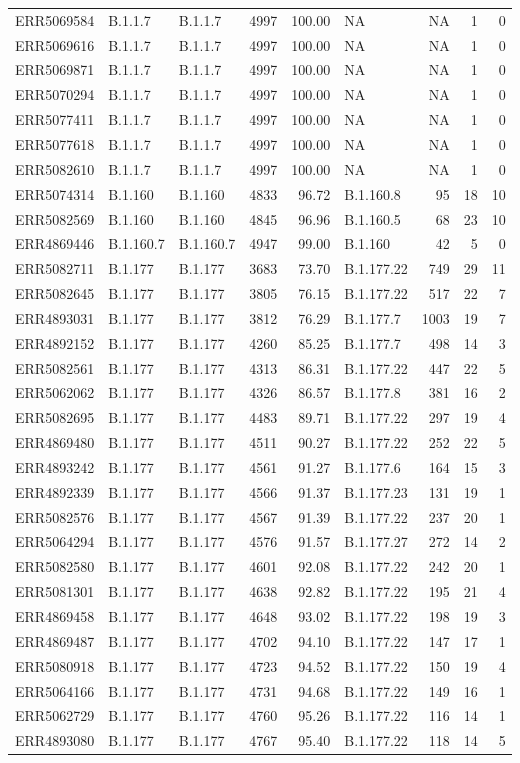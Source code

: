 \documentclass[
]{article}
\begin{document}
\begin{longtable}[]{@{}lllrrlrrr@{}}
ERR5069584 & B.1.1.7 & B.1.1.7 & 4997 & 100.00 & NA & NA & 1 &
0\tabularnewline
ERR5069616 & B.1.1.7 & B.1.1.7 & 4997 & 100.00 & NA & NA & 1 &
0\tabularnewline
ERR5069871 & B.1.1.7 & B.1.1.7 & 4997 & 100.00 & NA & NA & 1 &
0\tabularnewline
ERR5070294 & B.1.1.7 & B.1.1.7 & 4997 & 100.00 & NA & NA & 1 &
0\tabularnewline
ERR5077411 & B.1.1.7 & B.1.1.7 & 4997 & 100.00 & NA & NA & 1 &
0\tabularnewline
ERR5077618 & B.1.1.7 & B.1.1.7 & 4997 & 100.00 & NA & NA & 1 &
0\tabularnewline
ERR5082610 & B.1.1.7 & B.1.1.7 & 4997 & 100.00 & NA & NA & 1 &
0\tabularnewline
ERR5074314 & B.1.160 & B.1.160 & 4833 & 96.72 & B.1.160.8 & 95 & 18 &
10\tabularnewline
ERR5082569 & B.1.160 & B.1.160 & 4845 & 96.96 & B.1.160.5 & 68 & 23 &
10\tabularnewline
ERR4869446 & B.1.160.7 & B.1.160.7 & 4947 & 99.00 & B.1.160 & 42 & 5 &
0\tabularnewline
ERR5082711 & B.1.177 & B.1.177 & 3683 & 73.70 & B.1.177.22 & 749 & 29 &
11\tabularnewline
ERR5082645 & B.1.177 & B.1.177 & 3805 & 76.15 & B.1.177.22 & 517 & 22 &
7\tabularnewline
ERR4893031 & B.1.177 & B.1.177 & 3812 & 76.29 & B.1.177.7 & 1003 & 19 &
7\tabularnewline
ERR4892152 & B.1.177 & B.1.177 & 4260 & 85.25 & B.1.177.7 & 498 & 14 &
3\tabularnewline
ERR5082561 & B.1.177 & B.1.177 & 4313 & 86.31 & B.1.177.22 & 447 & 22 &
5\tabularnewline
ERR5062062 & B.1.177 & B.1.177 & 4326 & 86.57 & B.1.177.8 & 381 & 16 &
2\tabularnewline
ERR5082695 & B.1.177 & B.1.177 & 4483 & 89.71 & B.1.177.22 & 297 & 19 &
4\tabularnewline
ERR4869480 & B.1.177 & B.1.177 & 4511 & 90.27 & B.1.177.22 & 252 & 22 &
5\tabularnewline
ERR4893242 & B.1.177 & B.1.177 & 4561 & 91.27 & B.1.177.6 & 164 & 15 &
3\tabularnewline
ERR4892339 & B.1.177 & B.1.177 & 4566 & 91.37 & B.1.177.23 & 131 & 19 &
1\tabularnewline
ERR5082576 & B.1.177 & B.1.177 & 4567 & 91.39 & B.1.177.22 & 237 & 20 &
1\tabularnewline
ERR5064294 & B.1.177 & B.1.177 & 4576 & 91.57 & B.1.177.27 & 272 & 14 &
2\tabularnewline
ERR5082580 & B.1.177 & B.1.177 & 4601 & 92.08 & B.1.177.22 & 242 & 20 &
1\tabularnewline
ERR5081301 & B.1.177 & B.1.177 & 4638 & 92.82 & B.1.177.22 & 195 & 21 &
4\tabularnewline
ERR4869458 & B.1.177 & B.1.177 & 4648 & 93.02 & B.1.177.22 & 198 & 19 &
3\tabularnewline
ERR4869487 & B.1.177 & B.1.177 & 4702 & 94.10 & B.1.177.22 & 147 & 17 &
1\tabularnewline
ERR5080918 & B.1.177 & B.1.177 & 4723 & 94.52 & B.1.177.22 & 150 & 19 &
4\tabularnewline
ERR5064166 & B.1.177 & B.1.177 & 4731 & 94.68 & B.1.177.22 & 149 & 16 &
1\tabularnewline
ERR5062729 & B.1.177 & B.1.177 & 4760 & 95.26 & B.1.177.22 & 116 & 14 &
1\tabularnewline
ERR4893080 & B.1.177 & B.1.177 & 4767 & 95.40 & B.1.177.22 & 118 & 14 &
5\tabularnewline

\end{longtable}
\end{document}
